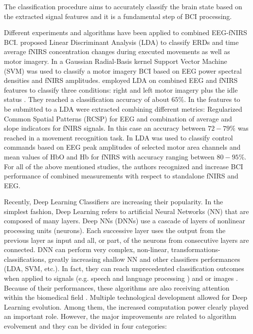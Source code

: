 \documentclass[12pt ]{iopart}
\begin{document}
The classification procedure aims to accurately classify the brain state  based on the extracted signal features  and it is a fundamental step of BCI processing.


Different  experiments and algorithms have been applied  to combined EEG-fNIRS BCI.  \textcite{Fazli_2012} proposed Linear Discriminant Analysis (LDA) to classify ERDs and time average fNIRS concentration changes during executed movements as well as motor imagery.  In \textcite{ma2012hybrid} a Gaussian Radial-Basis kernel Support Vector Machine (SVM) was used to classify a motor imagery BCI based on EEG power spectral densities and fNIRS amplitudes.   \textcite{lee2014hybrid} employed LDA on combined EEG and fNIRS features to classify three conditions: right and left motor imagery plus the idle status . They reached a classification accuracy of about $65\%$. In \textcite{buccino2016hybrid} the features to be submitted to a LDA were extracted combining different metrics: Regularized Common Spatial Patterns (RCSP) for EEG and combination of average and slope indicators for fNIRS signals. In this case an accuracy between $72-79\%$ was reached in a movement recognition task. In  \textcite{khan2014decoding, khan2017hybrid} LDA was used to classify control commands based on EEG peak amplitudes of selected motor area channels and mean values of HbO and Hb for fNIRS with accuracy ranging between $80-95\%$.
For all of the above mentioned studies, the authors recognized and increase BCI performance of combined measurements with respect to standalone fNIRS and EEG.

Recently, Deep Learning Classifiers are increasing their popularity. In the simplest fashion, Deep Learning  refers to artificial Neural Networks (NN) \parencite{lecun2015deep, schmidhuber2015deep} that are composed of many layers. Deep NNs (DNNs) use a cascade of  layers of nonlinear processing units (neurons). Each successive layer uses the output from the previous layer as input and all, or part, of the neurons from consecutive layers are connected. DNN can perform very complex, non-linear, transformations-classifications, greatly increasing shallow NN  \parencite{bianchini2014complexity}  and other classifiers performances (LDA, SVM, etc.). In fact, they can reach unprecedented classification outcomes when applied to signals (e.g. speech and language processing ) and or images \parencite{simonyan2014very, hinton2012deep, collobert2008unified, krizhevsky2012imagenet}. Because of their performances, these algorithms are also receiving  attention within the biomedical field \parencite{ronneberger2015u, hudson2000neural, ciresan2012deep}. 
Multiple technological development allowed for Deep Learning evolution. 
Among them, the increased computation power clearly played an important role.
However, the major improvements are  related to algorithm evolvement and they can be divided in four  categories:
\end{document}
